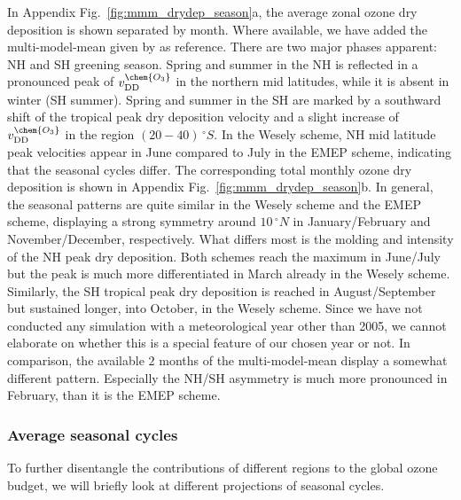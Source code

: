 \documentclass[gmd, manuscript]{copernicus}
\begin{document}
In Appendix Fig.~\ref{fig:mmm_drydep_season}a, the average zonal ozone dry deposition is shown separated by month. Where available, we have added the multi-model-mean given by \citet{ACP:Hardacre2015} as reference. There are two major phases apparent: NH and SH greening season. Spring and summer in the NH is reflected in a pronounced peak of $v_\text{DD}^\chem{O_3}$ in the northern mid latitudes, while it is absent in winter (SH summer). Spring and summer in the SH are marked by a southward shift of the tropical peak dry deposition velocity and a slight increase of $v_\text{DD}^\chem{O_3}$ in the region $(20-40)\,\unit{^\circ S}$. In the Wesely scheme, NH mid latitude peak velocities appear in June compared to July in the EMEP scheme, indicating that the seasonal cycles differ. The corresponding total monthly ozone dry deposition is shown in Appendix Fig.~\ref{fig:mmm_drydep_season}b. In general, the seasonal patterns are quite similar in the Wesely scheme and the EMEP scheme, displaying a strong symmetry around $10\,\unit{^\circ N}$ in January/February and November/December, respectively. What differs most is the molding and intensity of the NH peak dry deposition. Both schemes reach the maximum in June/July but the peak is much more differentiated in March already in the Wesely scheme. Similarly, the SH tropical peak dry deposition is reached in August/September but sustained longer, into October, in the Wesely scheme. Since we have not conducted any simulation with a meteorological year other than 2005, we cannot elaborate on whether this is a special feature of our chosen year or not. In comparison, the available $2$ months of the multi-model-mean display a somewhat different pattern. Especially the NH/SH asymmetry is much more pronounced in February, than it is the EMEP scheme.
%
\subsubsection{Average seasonal cycles}
\label{subsubsec:seasons}
%
To further disentangle the contributions of different regions to the global ozone budget, we will briefly look at different projections of seasonal cycles.
\end{document}
